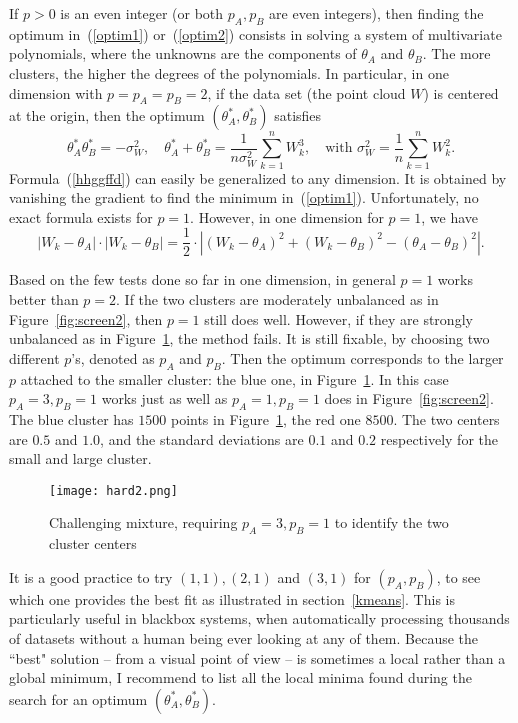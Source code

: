\documentclass[oneside,10pt]{book}
\begin{document}
If $p>0$ is an even integer (or both $p_A,p_B$ are even integers), then finding the optimum in~(\ref{optim1}) or~(\ref{optim2}) consists in solving a system of
 multivariate polynomials, where the
 unknowns are the components of $\theta_A$ and $\theta_B$. The more clusters, the higher the degrees of the polynomials. In particular, in one dimension with $p=p_A=p_B=2$, if the data set (the point cloud $W$) is centered at the origin, then the optimum $(\theta_A^*,\theta_B^*)$ satisfies
\begin{equation}
\theta_A^* \theta_B^* =-\sigma^2_W, \quad \theta_A^*+\theta_B^*=\frac{1}{n\sigma^2_W}\sum_{k=1}^n W_k^3,
\quad \text{with } \sigma^2_W=\frac{1}{n}\sum_{k=1}^n W_k^2. \label{hhggffd}
\end{equation}
Formula~(\ref{hhggffd}) can easily be generalized to any dimension. It is obtained by vanishing the gradient to find the minimum in~(\ref{optim1}). Unfortunately, no exact formula exists for $p=1$. However, in one dimension for $p=1$, we have
$$
|W_k-\theta_A|\cdot |W_k-\theta_B| = \frac{1}{2}\cdot | (W_k-\theta_A)^2 + (W_k-\theta_B)^2-(\theta_A -\theta_B)^2 |.
$$

Based on the few tests done so far in one dimension, in general $p=1$ works better than $p=2$. If the two clusters are moderately unbalanced as in Figure~\ref{fig:screen2}, then $p=1$ still does well.
However, if they are strongly unbalanced as in Figure~\ref{fig:hard}, the method fails.  It is still fixable, by choosing two different $p$'s,  denoted as $p_A$ and $p_B$. Then the optimum
corresponds to the larger $p$ attached to
 the smaller cluster: the blue one, in Figure~\ref{fig:hard}.  In this case $p_A=3,p_B=1$ works just as well  as $p_A=1, p_B=1$ does
 in Figure~\ref{fig:screen2}.
The blue cluster has $1500$ points in Figure~\ref{fig:hard}, the red one $8500$. The two centers are $0.5$ and $1.0$,
   and the standard deviations are $0.1$ and $0.2$ respectively for the small and large cluster.

\begin{figure}[H]
\centering
\texttt{[image: hard2.png]}
\caption{Challenging mixture, requiring $p_A=3,p_B=1$ to identify the two cluster centers}
\label{fig:hard}
\end{figure}


 It is a good practice to try $(1,1), (2,1)$ and $(3,1)$ for $(p_A,p_B)$, to see which one provides the best fit as illustrated
 in section~\ref{kmeans}. This is particularly useful in blackbox systems, when automatically processing thousands of datasets without a human being ever looking at any of them.  Because the
 ``best" solution -- from a visual point of view -- is sometimes a local rather than a global minimum, I recommend to list all the local minima found during the search for an
 optimum $(\theta_A^*,\theta_B^*)$.
\end{document}
